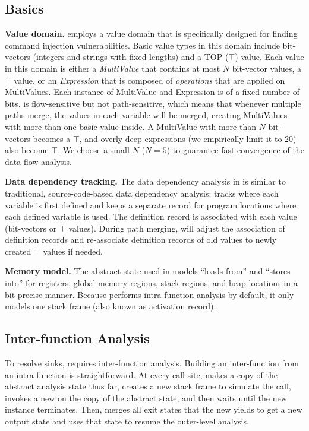 \subsection{\rda Basics}

\noindent
\textbf{Value domain.}
\rda employs a value domain that is specifically designed for finding command injection vulnerabilities.
Basic value types in this domain include bit-vectors (integers and strings with fixed lengths) and a TOP ($\top$) value.
Each value in this domain is either a \emph{MultiValue} that contains at most $N$ bit-vector values, a $\top$ value, or an \emph{Expression} that is composed of \emph{operations} that are applied on MultiValues.
Each instance of MultiValue and Expression is of a fixed number of bits.
\rda is flow-sensitive but not path-sensitive, which means that whenever multiple paths merge, the values in each variable will be merged, creating MultiValues with more than one basic value inside.
A MultiValue with more than $N$ bit-vectors becomes a $\top$, and overly deep expressions (we empirically limit it to 20) also become $\top$.
We choose a small $N$ ($N=5$) to guarantee fast convergence of the data-flow analysis.

\smallskip
\noindent
\textbf{Data dependency tracking.}
The data dependency analysis in \rda is similar to traditional, source-code-based data dependency analysis:
\rda tracks where each variable is first defined and keeps a separate record for program locations where each defined variable is used.
The definition record is associated with each value (bit-vectors or $\top$ values).
During path merging, \rda will adjust the association of definition records and re-associate definition records of old values to newly created $\top$ values if needed.

\smallskip
\noindent
\textbf{Memory model.}
The abstract state used in \rda models ``loads from'' and ``stores into'' for registers, global memory regions, stack regions, and heap locations in a bit-precise manner.
Because \rda performs intra-function analysis by default, it only models one stack frame (also known as activation record).

\subsection{Inter-function Analysis}
To resolve sinks, \mango requires inter-function analysis.
Building an inter-function \rda from an intra-function \rda is straightforward.
At every call site, \mango makes a copy of the abstract analysis state thus far, creates a new stack frame to simulate the call, invokes a new \rda on the copy of the abstract state, and then waits until the new \rda instance terminates.
Then, \mango merges all exit states that the new \rda yields to get a new output state and uses that state to resume the outer-level \rda analysis.

